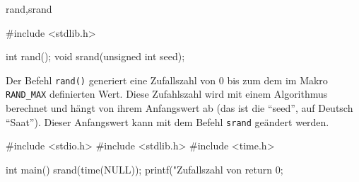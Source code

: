 \begin{man}{rand,srand}
    \begin{synopsis}
        \begin{plaincode}[gobble=8]
            #include <stdlib.h>

            int rand();
            void srand(unsigned int seed);
        \end{plaincode}
    \end{synopsis}

    \begin{desc}
        Der Befehl \texttt{rand()} generiert eine Zufallszahl von 0 bis zum dem im Makro \texttt{RAND\_MAX} definierten Wert. Diese Zufahlszahl wird mit einem Algorithmus berechnet und hängt von ihrem Anfangswert ab (das ist die ``seed'', auf Deutsch ``Saat''). Dieser Anfangswert kann mit dem Befehl \texttt{srand} geändert werden.
    \end{desc}

    \begin{example}
        \begin{code}
#include <stdio.h>
#include <stdlib.h>
#include <time.h>

int main() {
    srand(time(NULL));
    printf("Zufallszahl von %
    return 0;
}
        \end{code}
    \end{example}


    \begin{seeother}
    \end{seeother}
\end{man}

